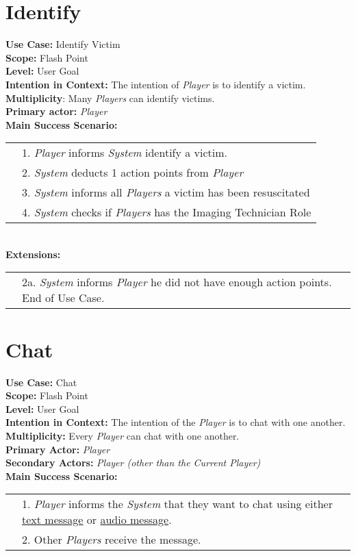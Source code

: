 \documentclass{article}
\begin{document}
	\section*{Identify}
	\textbf{Use Case:} Identify Victim\\
	\textbf{Scope:} Flash Point\\
	\textbf{Level:} User Goal\\
	\textbf{Intention in Context:} The intention of \textit{Player} is to identify a victim.\\
	\textbf{Multiplicity}: Many \textit{Players} can identify victims.\\
	\textbf{Primary actor:} \textit{Player}\\
	\textbf{Main Success Scenario:}\\
	\begin{tabular}{l l}
		&1. \textit{Player} informs \textit{System} identify a victim.\\
		&2. \textit{System} deducts 1 action points from \textit{Player}\\
		&3. \textit{System} informs all \textit{Players} a victim has been resuscitated\\
		&4. \textit{System} checks if \textit{Players} has the Imaging Technician Role\\
	\end{tabular}\\
	\textbf{Extensions:}\\
	\begin{tabular}{l l}
		&2a. \textit{System} informs \textit{Player} he did not have enough action points. End of Use Case.
	\end{tabular}
	\section*{Chat}
	\textbf{Use Case:} Chat\\
	\textbf{Scope:} Flash Point\\
	\textbf{Level:} User Goal\\
	\textbf{Intention in Context: } The intention of the \textit{Player} is to chat with one another.\\
	\textbf{Multiplicity: } Every \textit{Player} can chat with one another.\\
	\textbf{Primary Actor:} \textit{Player}\\
	\textbf{Secondary Actors:} \textit{Player (other than the Current Player)}\\
	\textbf{Main Success Scenario:}\\
	\begin{tabular}{l l}
		&1. \textit{Player} informs the \textit{System} that they want to chat using either \underline{text message} or \underline{audio message}.\\
		&2. Other \textit{Players} receive the message.
	\end{tabular}
\end{document}
